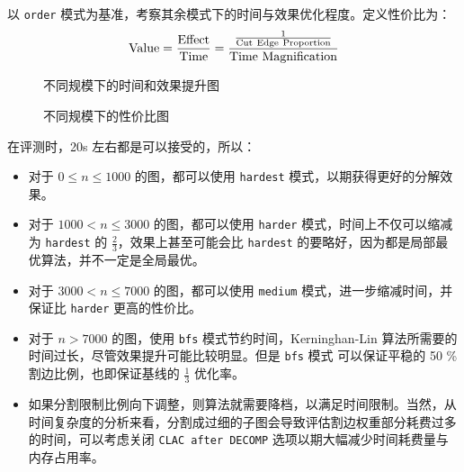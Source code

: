 \documentclass[a4paper,12pt]{article}
\begin{document}
\begin{CJK}{UTF8}{song}
以 \texttt{order} 模式为基准，考察其余模式下的时间与效果优化程度。定义性价比为：
\begin{equation}
    \text{Value} = \frac{\rm Effect}{\rm Time} = \frac{\frac{1}{\rm Cut~Edge~Proportion}}{\rm Time~Magnification}
\end{equation}

\begin{figure}[H]
    \centering
    
    
    \caption{不同规模下的时间和效果提升图}
\end{figure}

\begin{figure}[H]
    \centering
    
    \caption{不同规模下的性价比图}
\end{figure}

在评测时，20s 左右都是可以接受的，所以：
\begin{itemize}
    \item 对于 $0\leq n\leq 1000$ 的图，都可以使用 \texttt{hardest} 模式，以期获得更好的分解效果。
    \item 对于 $1000 < n\leq 3000$ 的图，都可以使用 \texttt{harder} 模式，时间上不仅可以缩减为 \texttt{hardest} 的 $\frac{2}{3}$，效果上甚至可能会比 \texttt{hardest} 的要略好，因为都是局部最优算法，并不一定是全局最优。
    \item 对于 $3000 < n \leq 7000$ 的图，都可以使用 \texttt{medium} 模式，进一步缩减时间，并保证比 \texttt{harder} 更高的性价比。
    \item 对于 $n > 7000$ 的图，使用 \texttt{bfs} 模式节约时间，Kerninghan-Lin 算法所需要的时间过长，尽管效果提升可能比较明显。但是 \texttt{bfs} 模式 可以保证平稳的 50 \% 割边比例，也即保证基线的 $\frac{1}{3}$ 优化率。
    \item 如果分割限制比例向下调整，则算法就需要降档，以满足时间限制。当然，从时间复杂度的分析来看，分割成过细的子图会导致评估割边权重部分耗费过多的时间，可以考虑关闭 \texttt{CLAC after DECOMP} 选项以期大幅减少时间耗费量与内存占用率。
\end{itemize}



\end{CJK}
\end{document}
